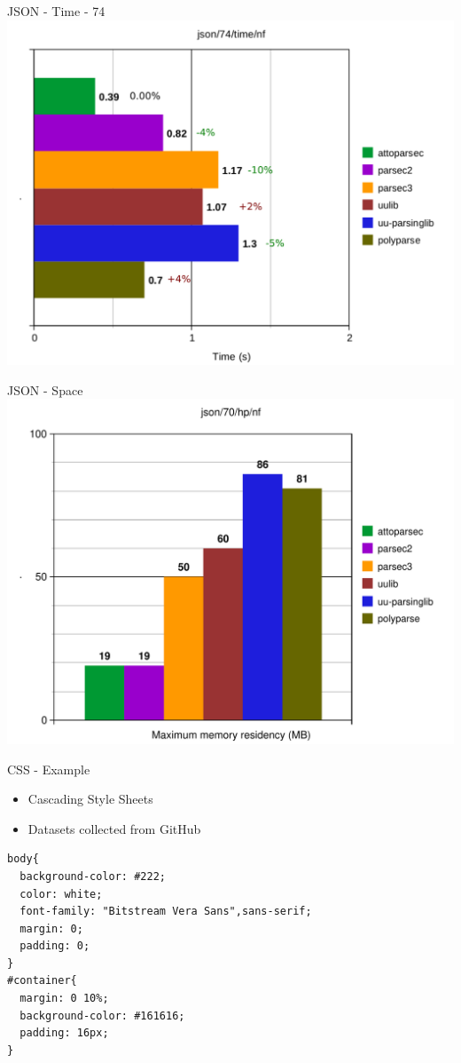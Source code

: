\documentclass{beamer}
\begin{document}
\begin{frame}{JSON - Time - 74}
\includegraphics[scale=0.5]{presentation/json-74-time-nf_.pdf}
\end{frame}

\begin{frame}{JSON - Space}
\includegraphics[scale=0.5]{presentation/json-70-hp-nf.pdf}
\end{frame}

\begin{frame}[fragile]{CSS - Example}
\begin{itemize}
\item Cascading Style Sheets
\item Datasets collected from GitHub
\end{itemize}
\begin{verbatim}
body{
  background-color: #222;
  color: white;
  font-family: "Bitstream Vera Sans",sans-serif;
  margin: 0;
  padding: 0;
}
#container{
  margin: 0 10%;
  background-color: #161616;
  padding: 16px;
}
\end{verbatim}
\end{frame}
\end{document}
